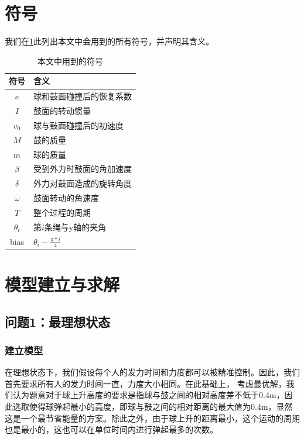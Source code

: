 \documentclass[nocover]{cumcmart}%
\begin{document}
\section{符号}
我们在\ref{table:symbol}此列出本文中会用到的所有符号，并声明其含义。
\begin{table} [!h]
\begin{center}
\vspace{-0.1in}
\caption{本文中用到的符号}
\label{table:symbol}
\begin{tabular}{|c|l|}
\hline
\textbf{符号}&\textbf{含义}\\
\hline
$e$&球和鼓面碰撞后的恢复系数\\
\hline
$I$&鼓面的转动惯量\\
\hline
$v_0$&球与鼓面碰撞后的初速度\\
\hline
$M$&鼓的质量\\
\hline
$m$&球的质量\\
\hline
$\beta$&受到外力时鼓面的角加速度\\
\hline
$\delta$&外力对鼓面造成的旋转角度\\
\hline
$\omega$&鼓面转动的角速度\\
\hline
$T$ &整个过程的周期\\
\hline
$\theta_i$ &第$i$条绳与y轴的夹角\\
\hline
bias &$\theta_i - \frac{\pi*i}{4}$\\
\hline
\end{tabular}
\vspace{-0.2in}
\end{center}
\end{table}


\section{模型建立与求解}
\subsection{问题1：最理想状态}
\subsubsection{建立模型}
在理想状态下，我们假设每个人的发力时间和力度都可以被精准控制。因此，我们首先要求所有人的发力时间一直，力度大小相同。在此基础上，
考虑最优解，我们认为题意对于球上升高度的要求是指球与鼓之间的相对高度差不低于0.4m，因此选取使得球弹起最小的高度，即球与鼓之间的相对距离的最大值为0.4m，显然这是一个最节省能量的方案。除此之外，由于球上升的距离最小，这个运动的周期也是最小的，这也可以在单位时间内进行弹起最多的次数。
\end{document}
